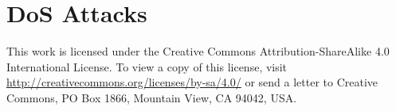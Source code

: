 \documentclass[10pt,a4paper]{article}
\begin{document}

\clearpage


\clearpage


\clearpage

\section{DoS Attacks}

\clearpage


\clearpage


\clearpage

\vspace*{\fill}
\centering
\tiny{This work is licensed under the Creative Commons Attribution-ShareAlike 4.0 International License. To view a copy of this license, visit \href{http://creativecommons.org/licenses/by-sa/4.0/}{http://creativecommons.org/licenses/by-sa/4.0/} or send a letter to Creative Commons, PO Box 1866, Mountain View, CA 94042, USA.}
\end{document}

